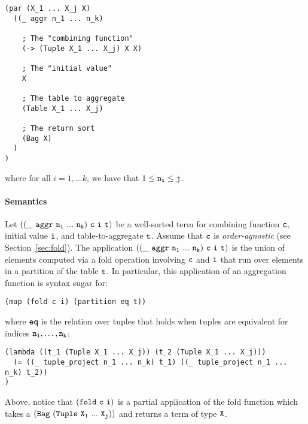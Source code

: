 \documentclass[english,a4paper,10pt]{article}
\begin{document}
\begin{verbatim}
(par (X_1 ... X_j X) 
  ((_ aggr n_1 ... n_k)
    
    ; The "combining function"
    (-> (Tuple X_1 ... X_j) X X)
    
    ; The "initial value"
    X
    
    ; The table to aggregate
    (Table X_1 ... X_j)
    
    ; The return sort
    (Bag X)
  )
)
\end{verbatim}
where for all $i = 1, \ldots k$,
we have that $1 \leq {\tt n_i} \leq {\tt j}$. 

\paragraph{Semantics}
Let $\syntax{((\_\ aggr\ n_1\ ...\ n_k)\ c\ i\ t)}$
be a well-sorted term for
combining function ${\tt c}$, 
initial value ${\tt i}$,
and table-to-aggregate ${\tt t}$.
Assume that ${\tt c}$ is \emph{order-agnostic} (see Section~\ref{sec:fold}).
The application $\syntax{((\_\ aggr\ n_1\ ...\ n_k)\ c\ i\ t)}$ is
the union of elements computed via a fold operation involving ${\tt c}$ and ${\tt i}$
that run over elements in a partition of the table ${\tt t}$.
In particular, this application of an aggregation function is syntax sugar for:
\begin{verbatim}
(map (fold c i) (partition eq t))
\end{verbatim}
where ${\tt eq}$ is the relation over tuples that holds
when tuples are equivalent for indices ${\tt n_1}, \ldots, {\tt n_k}$:
\begin{verbatim}
(lambda ((t_1 (Tuple X_1 ... X_j)) (t_2 (Tuple X_1 ... X_j)))
  (= ((_ tuple_project n_1 ... n_k) t_1) ((_ tuple_project n_1 ... n_k) t_2))
)
\end{verbatim}
Above, notice that 
$\syntax{(fold\ c\ i)}$ is a partial application of the fold
function which takes a $\syntax{(Bag\ (Tuple\ X_1\ ...\ X_j))}$
and returns a term of type ${\tt X}$.
\end{document}
